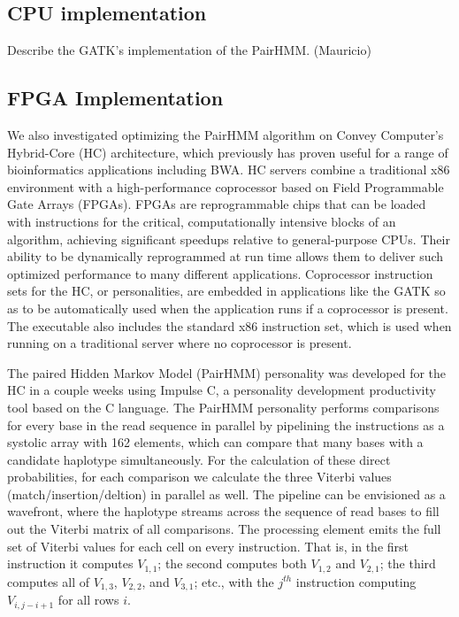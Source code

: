 \documentclass[11pt, oneside]{article}
\begin{document}
	\subsection{CPU implementation}
	Describe the GATK's implementation of the PairHMM. (Mauricio)
	\subsection{FPGA Implementation}
	We also investigated optimizing the PairHMM algorithm on Convey Computer’s Hybrid-Core (HC) architecture, which previously has proven useful for a range of bioinformatics applications including BWA. HC servers combine a traditional x86 environment with a high-performance coprocessor based on Field Programmable Gate Arrays (FPGAs).  FPGAs are reprogrammable chips that can be loaded with instructions for the critical, computationally intensive blocks of an algorithm, achieving significant speedups relative to general-purpose CPUs. Their ability to be dynamically reprogrammed at run time allows them to deliver such optimized performance to many different applications.   Coprocessor instruction sets for the HC, or personalities, are embedded in applications like the GATK so as to be automatically used when the application runs if a coprocessor is present.  The executable also includes the standard x86 instruction set, which is used when running on a traditional server where no coprocessor is present.

	The paired Hidden Markov Model (PairHMM) personality was developed for the HC in a couple weeks using Impulse C, a personality development productivity tool based on the C language.  The PairHMM personality performs comparisons for every base in the read sequence in parallel by pipelining the instructions as a systolic array with 162 elements, which can compare that many bases with a candidate haplotype simultaneously.  For the calculation of these direct probabilities, for each comparison we calculate the three Viterbi values (match/insertion/deltion) in parallel as well.  The pipeline can be envisioned as a wavefront, where the haplotype streams across the sequence of read bases to fill out the Viterbi matrix of all comparisons.  The processing element emits the full set of Viterbi values for each cell on every instruction.  That is, in the first instruction it computes $V_{1,1}$; the second computes both $V_{1,2}$ and $V_{2,1}$; the third computes all of $V_{1,3}$, $V_{2,2}$, and $V_{3,1}$; etc., with the $j^{th}$ instruction computing $V_{i, j - i + 1}$ for all rows $i$.
\end{document}
